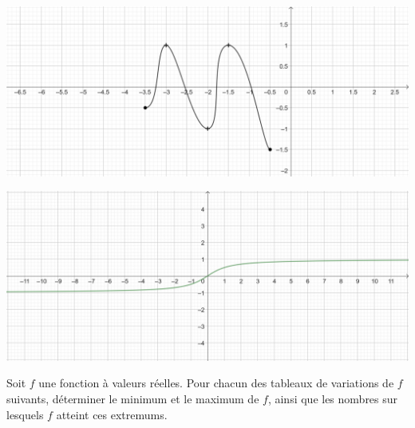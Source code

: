 \documentclass{exam}
\begin{document}
\begin{questions}
\begin{minipage}{0.45\textwidth}
\end{minipage}\hfill
\vspace*{1cm}
\begin{minipage}{0.45\textwidth}
\includegraphics[width=\textwidth]{Fonction3.png}
\end{minipage}\hfill
\begin{minipage}{0.45\textwidth}
\includegraphics[width=\textwidth]{Fonction4.png}
\end{minipage}
\newpage
\question Soit $f$ une fonction à valeurs réelles. Pour chacun des tableaux de variations de $f$ suivants, déterminer le minimum et le maximum de $f$, ainsi que les nombres sur lesquels $f$ atteint ces extremums.
\begin{center}
\end{center}
\vspace*{1cm}

\end{questions}
\end{document}
